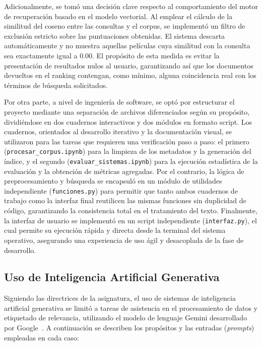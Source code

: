 \documentclass[conference,a4paper]{IEEEtran}
\begin{document}
Adicionalmente, se tomó una decisión clave respecto al comportamiento del motor de recuperación basado en el modelo vectorial. Al emplear el cálculo de la similitud del coseno entre las consultas y el corpus, se implementó un filtro de exclusión estricto sobre las puntuaciones obtenidas. El sistema descarta automáticamente y no muestra aquellas películas cuya similitud con la consulta sea exactamente igual a $0.00$. El propósito de esta medida es evitar la presentación de resultados nulos al usuario, garantizando así que los documentos devueltos en el ranking contengan, como mínimo, alguna coincidencia real con los términos de búsqueda solicitados.

Por otra parte, a nivel de ingeniería de software, se optó por estructurar el proyecto mediante una separación de archivos diferenciados según su propósito, dividiéndose en dos cuadernos interactivos y dos módulos en formato script. Los cuadernos, orientados al desarrollo iterativo y la documentación visual, se utilizaron para las tareas que requieren una verificación paso a paso: el primero (\texttt{procesar\_corpus.ipynb}) para la limpieza de los metadatos y la generación del índice, y el segundo (\texttt{evaluar\_sistemas.ipynb}) para la ejecución estadística de la evaluación y la obtención de métricas agregadas. Por el contrario, la lógica de preprocesamiento y búsqueda se encapsuló en un módulo de utilidades independiente (\texttt{funciones.py}) para permitir que tanto ambos cuadernos de trabajo como la interfaz final reutilicen las mismas funciones sin duplicidad de código, garantizando la consistencia total en el tratamiento del texto. Finalmente, la interfaz de usuario se implementó en un script independiente (\texttt{interfaz.py}), el cual permite su ejecución rápida y directa desde la terminal del sistema operativo, asegurando una experiencia de uso ágil y desacoplada de la fase de desarrollo.

\subsection{Uso de Inteligencia Artificial Generativa}

Siguiendo las directrices de la asignatura, el uso de sistemas de inteligencia artificial generativa se limitó a tareas de asistencia en el procesamiento de datos y etiquetado de relevancia, utilizando el modelo de lenguaje Gemini desarrollado por Google~\cite{b6}. A continuación se describen los propósitos y las entradas (\textit{prompts}) empleadas en cada caso:
\end{document}
